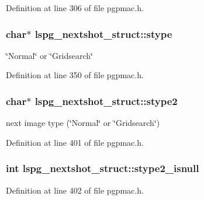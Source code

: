 Definition at line 306 of file pgpmac.\-h.

\hypertarget{structlspg__nextshot__struct_ab5a70b189c2fe516ca0c84bd06f3e564}{
\subsubsection[{stype}]{\setlength{\rightskip}{0pt plus 5cm}char$\ast$ lspg\-\_\-nextshot\-\_\-struct\-::stype}}\label{structlspg__nextshot__struct_ab5a70b189c2fe516ca0c84bd06f3e564}


\char`\"{}\-Normal\char`\"{} or \char`\"{}\-Gridsearch\char`\"{} 



Definition at line 350 of file pgpmac.\-h.

\hypertarget{structlspg__nextshot__struct_ae08ef74ea76e6e099a3ff6c7f845d337}{
\subsubsection[{stype2}]{\setlength{\rightskip}{0pt plus 5cm}char$\ast$ lspg\-\_\-nextshot\-\_\-struct\-::stype2}}\label{structlspg__nextshot__struct_ae08ef74ea76e6e099a3ff6c7f845d337}


next image type (\char`\"{}\-Normal\char`\"{} or \char`\"{}\-Gridsearch\char`\"{}) 



Definition at line 401 of file pgpmac.\-h.

\hypertarget{structlspg__nextshot__struct_a203e29ed0bb403aaab6d7f95f690cc0d}{
\subsubsection[{stype2\-\_\-isnull}]{\setlength{\rightskip}{0pt plus 5cm}int lspg\-\_\-nextshot\-\_\-struct\-::stype2\-\_\-isnull}}\label{structlspg__nextshot__struct_a203e29ed0bb403aaab6d7f95f690cc0d}


Definition at line 402 of file pgpmac.\-h.


